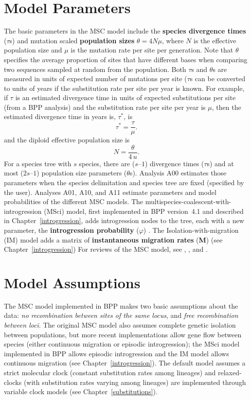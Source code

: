 \documentclass[a4paper]{book}
\numberwithin{equation}{section} \renewcommand{\baselinestretch}{0.55}
\begin{document}
\section{Model Parameters}
The basic parameters in the MSC model include the \textbf{species
  divergence times} ($\tau$s) and mutation scaled \textbf{population sizes}
$\theta = 4N\mu$, where $N$ is the effective population size and $\mu$
is the mutation rate per site per generation. Note that $\theta$
specifies the average proportion of sites that have different bases when
comparing two sequences sampled at random from the population.  Both $\tau$s and
$\theta$s are measured in units of expected number of mutations per site
($\tau$s can be converted to units of years if the substitution rate
per site per year is known. For example, if $\tau$ is an estimated divergence
time in units of expected substitutions per site (from a BPP analysis)
and the substitution rate per site per year is $\mu$, then the estimated
divergence time in years is, $\tau^*$, is
\begin{displaymath}
\tau^* = \frac{\tau}{\mu}.
\end{displaymath}
and the diploid effective population size is
\begin{displaymath}
N = \frac{\theta}{4\,u}.
\end{displaymath}
For a species tree with $s$ species, there are ($s – 1$) divergence
times ($\tau$s) and at most ($2s – 1$) population size parameters
($\theta$s).  Analysis A00 estimates those parameters when the species
delimitation and species tree are fixed (specified by the user).
Analyses A01, A10, and A11 estimate parameters and model probabilities
of the different MSC models.  The
multispecies-coalescent-with-introgression (MSci) model, first
implemented in BPP version~4.1 and described in
Chapter~\ref{introgression}, adds introgression nodes to the tree,
each with a new parameter, the \textbf{introgression probability}
($\varphi$) \citep[see][]{Flouri2020a}. The Isolation-with-migration (IM)
model adds a matrix of \textbf{instantaneous migration rates} (\textbf{M}) (see Chapter~\ref{introgression})   For reviews of the MSC model, see \citet[][Chapter 9]{Yang2014b}, \citet{Xu2016}, and \citet{Rannala2020a}.

\section{Model Assumptions}
The MSC model implemented in BPP makes two basic assumptions about the
data: \emph{no recombination between sites of the same locus}, and
\emph{free recombination between loci}.  The original MSC model
\citep[][]{Rannala2003} also assumes complete genetic isolation
between populations, but more recent implementations allow gene
flow between species (either continuous migration or episodic
introgression); the MSci model implemented in BPP allows episodic
introgression \citep[][]{Flouri2020a} and the IM model allows
continuous migration (see Chapter~\ref{introgression}).  The default model assumes a strict
molecular clock (constant substitution rates among lineages) and
relaxed-clocks (with substitution rates varying among lineages)
are implemented through variable clock models (see Chapter~\ref{substitutions}).
\end{document}
